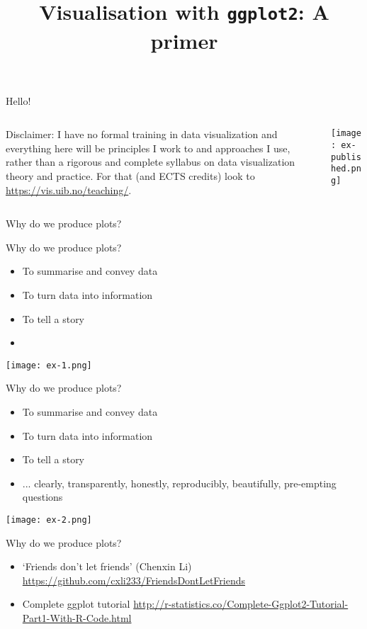 \documentclass[10pt]{beamer}
\title{Visualisation with \texttt{ggplot2}: A primer}
\institute{\vspace{-0.8cm} \\ \large Iain Johnston \vspace{0.25cm} \\ \scriptsize Department of Mathematics\\ University of Bergen\\ \vspace{0.4cm}} %
\date{}
\begin{document}
\frame{\titlepage}

\begin{frame}{Hello!}
  \begin{columns}
    \begin{column}{0.5\textwidth}
      Disclaimer: I have no formal training in data visualization and everything here will be principles I work to and approaches I use, rather than a rigorous and complete syllabus on data visualization theory and practice. For that (and ECTS credits) look to \url{https://vis.uib.no/teaching/}.
    \end{column}
    \begin{column}{0.5\textwidth}
      \texttt{[image: ex-published.png]}
    \end{column}
    \end{columns}
\end{frame}

\begin{frame}{Why do we produce plots?}
\end{frame}

\begin{frame}{Why do we produce plots?}
      \begin{itemize}
      \item To summarise and convey data
      \item To turn data into information
      \item To tell a story
        \item[]
      \end{itemize}
      \texttt{[image: ex-1.png]}
\end{frame}

\begin{frame}{Why do we produce plots?}
      \begin{itemize}
      \item To summarise and convey data
      \item To turn data into information
      \item To tell a story
        \item ... clearly, transparently, honestly, reproducibly, beautifully, pre-empting questions
      \end{itemize}
      \texttt{[image: ex-2.png]}
\end{frame}

\begin{frame}{Why do we produce plots?}
      \begin{itemize}
      \item `Friends don't let friends' (Chenxin Li) \url{https://github.com/cxli233/FriendsDontLetFriends}
        \item Complete ggplot tutorial \url{http://r-statistics.co/Complete-Ggplot2-Tutorial-Part1-With-R-Code.html}
      \end{itemize}
\end{frame}
\end{document}
